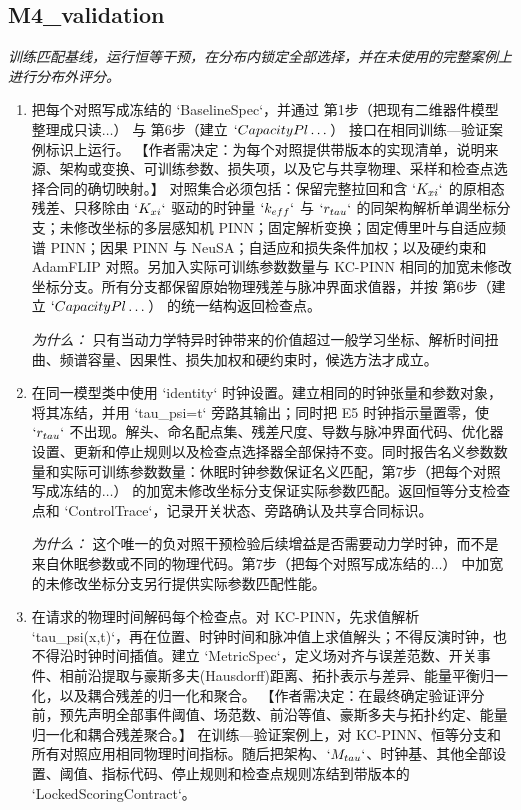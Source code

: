 \documentclass[10pt,a4paper]{article}
\begin{document}
\subsection*{M4\_validation}
\emph{训练匹配基线，运行恒等干预，在分布内锁定全部选择，并在未使用的完整案例上进行分布外评分。}
\begin{enumerate}[leftmargin=*,start=7]
  \item 把每个对照写成冻结的 `BaselineSpec`，并通过 第1步（把现有二维器件模型整理成只读\(\dots \)） 与 第6步（建立 \(`CapacityPl\dots \)） 接口在相同训练---验证案例标识上运行。 【作者需决定：为每个对照提供带版本的实现清单，说明来源、架构或变换、可训练参数、损失项，以及它与共享物理、采样和检查点选择合同的确切映射。】 对照集合必须包括：保留完整拉回和含 \(`K_{xi}`\) 的原相态残差、只移除由 \(`K_{xi}`\) 驱动的时钟量 \(`k_{eff}`\) 与 \(`r_{tau}`\) 的同架构解析单调坐标分支；未修改坐标的多层感知机 PINN；固定解析变换；固定傅里叶与自适应频谱 PINN；因果 PINN 与 NeuSA；自适应和损失条件加权；以及硬约束和 AdamFLIP 对照。另加入实际可训练参数数量与 KC-PINN 相同的加宽未修改坐标分支。所有分支都保留原始物理残差与脉冲界面求值器，并按 第6步（建立 \(`CapacityPl\dots \)） 的统一结构返回检查点。
\par\emph{为什么：} 只有当动力学特异时钟带来的价值超过一般学习坐标、解析时间扭曲、频谱容量、因果性、损失加权和硬约束时，候选方法才成立。
  \item 在同一模型类中使用 `identity` 时钟设置。建立相同的时钟张量和参数对象，将其冻结，并用 `tau\_psi=t` 旁路其输出；同时把 E5 时钟指示量置零，使 \(`r_{tau}`\) 不出现。解头、命名配点集、残差尺度、导数与脉冲界面代码、优化器设置、更新和停止规则以及检查点选择器全部保持不变。同时报告名义参数数量和实际可训练参数数量：休眠时钟参数保证名义匹配，第7步（把每个对照写成冻结的\(\dots \)） 的加宽未修改坐标分支保证实际参数匹配。返回恒等分支检查点和 `ControlTrace`，记录开关状态、旁路确认及共享合同标识。
\par\emph{为什么：} 这个唯一的负对照干预检验后续增益是否需要动力学时钟，而不是来自休眠参数或不同的物理代码。第7步（把每个对照写成冻结的\(\dots \)） 中加宽的未修改坐标分支另行提供实际参数匹配性能。
  \item 在请求的物理时间解码每个检查点。对 KC-PINN，先求值解析 `tau\_psi(x,t)`，再在位置、时钟时间和脉冲值上求值解头；不得反演时钟，也不得沿时钟时间插值。建立 `MetricSpec`，定义场对齐与误差范数、开关事件、相前沿提取与豪斯多夫(Hausdorff)距离、拓扑表示与差异、能量平衡归一化，以及耦合残差的归一化和聚合。 【作者需决定：在最终确定验证评分前，预先声明全部事件阈值、场范数、前沿等值、豪斯多夫与拓扑约定、能量归一化和耦合残差聚合。】 在训练---验证案例上，对 KC-PINN、恒等分支和所有对照应用相同物理时间指标。随后把架构、\(`M_{tau}`\)、时钟基、其他全部设置、阈值、指标代码、停止规则和检查点规则冻结到带版本的 `LockedScoringContract`。

\end{enumerate}
\end{document}
